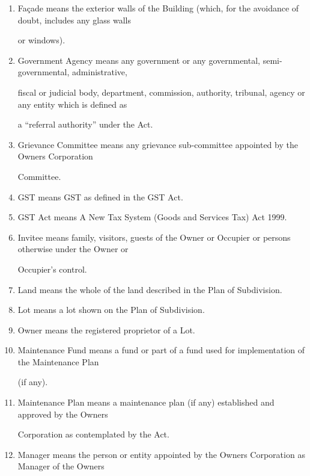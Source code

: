 \documentclass{article}
\begin{document}
\begin{enumerate}[label=\arabic*.]
\begin{enumerate}[label=\arabic{enumi}.\arabic*.]
\begin{enumerate}[label=(\arabic*)]
\begin{enumerate}[label=(\alph*)]
\end{enumerate}
\item  Façade means the exterior walls of the Building (which, for the avoidance of doubt, includes any glass walls 

or windows). 

\item  Government Agency means any government or any governmental, semi-governmental, administrative, 

fiscal or judicial body, department, commission, authority, tribunal, agency or any entity which is defined as 

a “referral authority” under the Act. 

\item  Grievance Committee means any grievance sub-committee appointed by the Owners Corporation 

Committee. 

\item  GST means GST as defined in the GST Act. 

\item  GST Act means A New Tax System (Goods and Services Tax) Act 1999. 

\item  Invitee means family, visitors, guests of the Owner or Occupier or persons otherwise under the Owner or 

Occupier’s control. 

\item  Land means the whole of the land described in the Plan of Subdivision. 

\item  Lot means a lot shown on the Plan of Subdivision. 

\item  Owner means the registered proprietor of a Lot. 

\item  Maintenance Fund means a fund or part of a fund used for implementation of the Maintenance Plan 

(if any).  

\item  Maintenance Plan means a maintenance plan (if any) established and approved by the Owners 

Corporation as contemplated by the Act.  

\item  Manager means the person or entity appointed by the Owners Corporation as Manager of the Owners 


\end{enumerate}
\end{enumerate}
\end{enumerate}
\end{document}
